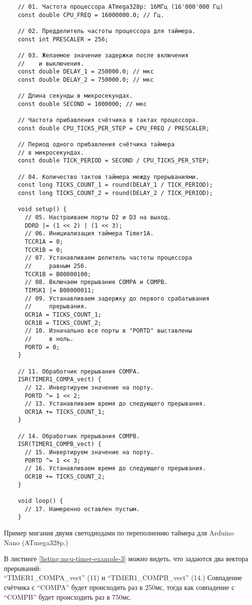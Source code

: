 \documentclass[../sparc.tex]{subfiles}
\begin{document}
\begin{listing}[H]
  \begin{verbatim}
    // 01. Частота процессора ATmega328p: 16МГц (16'000'000 Гц)
    const double CPU_FREQ = 16000000.0; // Гц.

    // 02. Предделитель частоты процессора для таймера.
    const int PRESCALER = 256;

    // 03. Желаемое значение задержки после включения
    //    и выключения.
    const double DELAY_1 = 250000.0; // мкс
    const double DELAY_2 = 750000.0; // мкс

    // Длина секунды в микросекундах.
    const double SECOND = 1000000; // мкс

    // Частота прибавления счётчика в тактах процессора.
    const double CPU_TICKS_PER_STEP = CPU_FREQ / PRESCALER;

    // Период одного прибавления счётчика таймера
    // в микросекундах.
    const double TICK_PERIOD = SECOND / CPU_TICKS_PER_STEP;

    // 04. Количество тактов таймера между прерываниями.
    const long TICKS_COUNT_1 = round(DELAY_1 / TICK_PERIOD);
    const long TICKS_COUNT_2 = round(DELAY_2 / TICK_PERIOD);

    void setup() {
      // 05. Настраиваем порты D2 и D3 на выход.
      DDRD |= (1 << 2) | (1 << 3);
      // 06. Инициализация таймера Timer1A.
      TCCR1A = 0;
      TCCR1B = 0;
      // 07. Устанавливаем делитель частоты процессора
      //     равным 256.
      TCCR1B = B00000100;
      // 08. Включаем прерывание COMPA и COMPB.
      TIMSK1 |= B00000011;
      // 09. Устанавливаем задержку до первого срабатывания
      //     прерывания.
      OCR1A = TICKS_COUNT_1;
      OCR1B = TICKS_COUNT_2;
      // 10. Изначально все порты в "PORTD" выставлены
      //     в ноль.
      PORTD = 0;
    }

    // 11. Обработчик прерывания COMPA.
    ISR(TIMER1_COMPA_vect) {
      // 12. Инвертируем значение на порту.
      PORTD ^= 1 << 2;
      // 13. Устанавливаем время до следующего прерывания.
      OCR1A += TICKS_COUNT_1;
    }

    // 14. Обработчик прерывания COMPB.
    ISR(TIMER1_COMPB_vect) {
      // 15. Инвертируем значение на порту.
      PORTD ^= 1 << 3;
      // 16. Устанавливаем время до следующего прерывания.
      OCR1B += TICKS_COUNT_2;
    }

    void loop() {
      // 17. Намеренно оставлен пустым.
    }
  \end{verbatim}
  \caption{Пример мигания двумя светодиодами по переполнению таймера для Arduino
    Nano (ATmega328p.)}
  \label{listing:mcu-timer-example-3}
\end{listing}

В листинге \ref{listing:mcu-timer-example-3} можно видеть, что задаются два
вектора прерываний:\\``TIMER1\_COMPA\_vect'' (11) и ``TIMER1\_COMPB\_vect''
(14.)  Совпадение счётчика с ``COMPA'' будет происходить раз в 250мс, тогда как
совпадение с ``COMPB'' будет происходить раз в 750мс.
\end{document}
